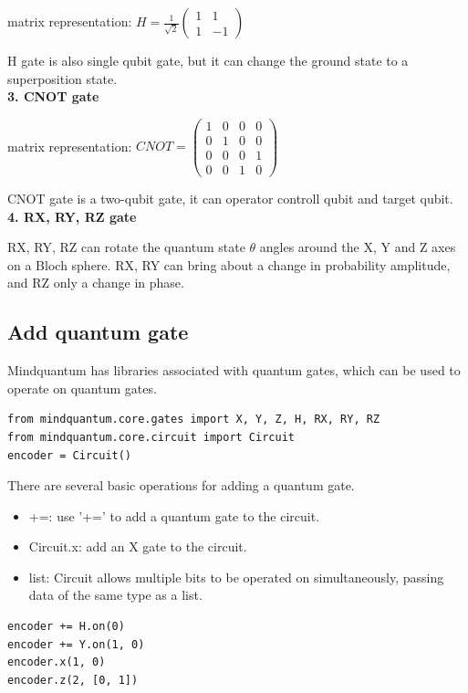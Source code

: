 matrix representation: $H = \frac{1}{\sqrt{2}} \left( \begin{array}{cc}
            1 & 1  \\
            1 & -1
        \end{array} \right)$

H gate is also single qubit gate, but it can change the ground state to a superposition state. \\

\textbf{3. CNOT gate}

matrix representation: $CNOT = \left( \begin{array}{cccc}
            1 & 0 & 0 & 0 \\
            0 & 1 & 0 & 0 \\
            0 & 0 & 0 & 1 \\
            0 & 0 & 1 & 0
        \end{array} \right)$

CNOT gate is a two-qubit gate, it can operator controll qubit and target qubit. \\

\textbf{4. RX, RY, RZ gate}

RX, RY, RZ can rotate the quantum state $\theta$ angles around the X, Y and Z axes on a Bloch sphere. RX, RY can bring about a change in probability amplitude, and RZ only a change in phase.
\subsection{Add quantum gate}
Mindquantum has libraries associated with quantum gates, which can be used to operate on quantum gates.
\begin{lstlisting}
from mindquantum.core.gates import X, Y, Z, H, RX, RY, RZ
from mindquantum.core.circuit import Circuit
encoder = Circuit()
\end{lstlisting}

There are several basic operations for adding a quantum gate.
\begin{itemize}
    \item +=: use '+=' to add a quantum gate to the circuit.
    \item Circuit.x: add an X gate to the circuit.
    \item list: Circuit allows multiple bits to be operated on simultaneously, passing data of the same type as a list.
\end{itemize}
\begin{lstlisting}
encoder += H.on(0)
encoder += Y.on(1, 0)
encoder.x(1, 0)
encoder.z(2, [0, 1])
\end{lstlisting}

